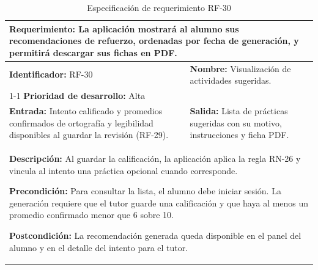 \begin{table}[H]
\caption{Especificación de requerimiento RF-30}
\centering
\renewcommand{\arraystretch}{1.3}
\setlength{\tabcolsep}{6pt}
\begin{tabular}{|p{7cm}|p{8cm}|}
\hline
\multicolumn{2}{|p{15cm}|}{\textbf{Requerimiento:} La aplicación mostrará al alumno sus recomendaciones de refuerzo, ordenadas por fecha de generación, y permitirá descargar sus fichas en PDF.} \\ \hline
\textbf{Identificador:} RF-30 &
\textbf{Nombre:} Visualización de actividades sugeridas. \\ \cline{1-1}
\textbf{Prioridad de desarrollo:} Alta &
\multicolumn{1}{p{8cm}|}{} \\ \hline
\textbf{Entrada:} Intento calificado y promedios confirmados de ortografía y legibilidad disponibles al guardar la revisión (RF-29). &
\textbf{Salida:} Lista de prácticas sugeridas con su motivo, instrucciones y ficha PDF. \\ \hline
\multicolumn{2}{|p{15cm}|}{
\textbf{Descripción:} Al guardar la calificación, la aplicación aplica la regla RN-26 y vincula al intento una práctica opcional cuando corresponde.

\vspace{0.2cm}
\textbf{Precondición:} Para consultar la lista, el alumno debe iniciar sesión. La generación requiere que el tutor guarde una calificación y que haya al menos un promedio confirmado menor que 6 sobre 10.

\vspace{0.2cm}
\textbf{Postcondición:} La recomendación generada queda disponible en el panel del alumno y en el detalle del intento para el tutor.
} \\ \hline
\end{tabular}
\label{tab:rf30}
\end{table}

